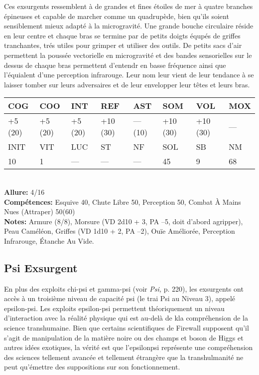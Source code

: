 Ces exsurgents ressemblent à de grandes et fines étoiles de mer à quatre branches épineuses et capable de marcher comme un quadrupède, bien qu'ils soient sensiblement mieux adapté à la microgravité. Une grande bouche circulaire réside en leur centre et chaque bras se termine par de petits doigts équpés de griffes tranchantes, trés utiles pour grimper et utiliser des outils. De petits sacs d'air permettent la poussée vectorielle en microgravité et des bandes sensorielles sur le dessus de chaque bras permettent d'entendr en basse fréquence ainsi que l'équialent d'une perception infrarouge. Leur nom leur vient de leur tendance à se laisser tomber sur leurs adversaires et de leur envelopper leur têtes et leurs bras. \\ \begin{tabular}{|l|l|l|l|l|l|l|l|} \hline

COG &COO &INT &REF &AST &SOM &VOL &MOX \\ \hline

+5 (20) &+5 (20) &+5 (20) &+10 (30) &— (10) &+10 (30) &+10 (30) &— \\ \hline

INIT &VIT &LUC &ST &NF &SOL &SB &NM \\ \hline

10 &1 &— &— &— &45 &9 &68 \\ \hline

\end{tabular} \\ \textbf{Allure:} 4/16 \\ \textbf{Compétences:} Esquive 40, Chute Libre 50, Perception 50, Combat À Mains Nues (Attraper) 50(60) \\ \textbf{Notes: }Armure (8/8), Morsure (VD 2d10 + 3, PA –5, doit d'abord agripper), Peau Caméléon, Griffes (VD 1d10 + 2, PA –2), Ouïe Améliorée, Perception Infrarouge, Étanche Au Vide. 

\subsection{Psi Exsurgent } 

En plus des exploits chi-psi et gamma-psi (voir \textit{Psi, } p. 220), les exsurgents ont accès à un troisième niveau de capacité psi (le trai Psi au Niveau 3), appelé epsilon-psi. Les exploits epsilon-psi permettent théoriquement un niveau d'interaction avec la réalité physique qui est au-delà de kla compréhension de la science transhumaine. Bien que certains scientifiques de Firewall supposent qu'il s'agit de manipulation de la matière noire ou des champs et boson de Higgs et autres idées exotiques, la vérité est que l'epsilonpsi représente une compréhension des sciences tellement avancée et tellement étrangère que la transhulmanité ne peut qu'émettre des suppositions sur son fonctionnement. 

